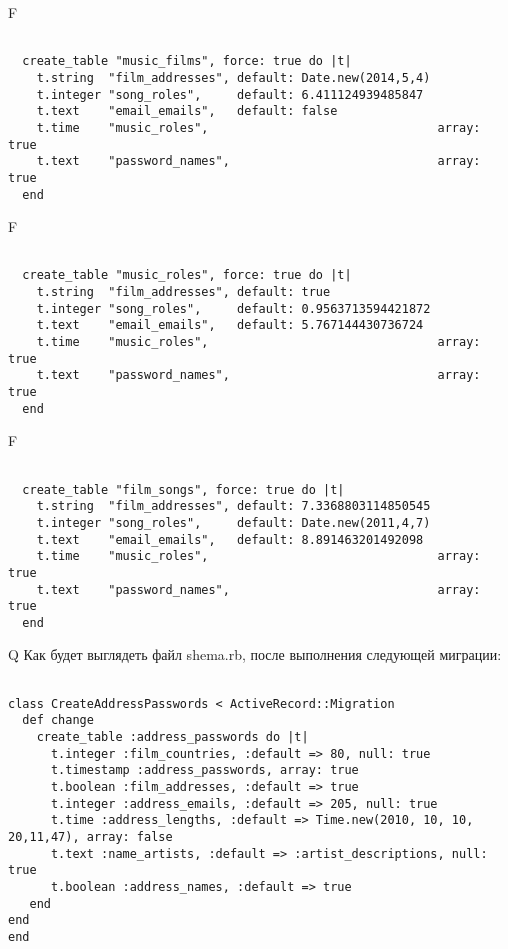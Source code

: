 F
\begin{verbatim}

  create_table "music_films", force: true do |t|
    t.string  "film_addresses", default: Date.new(2014,5,4)
    t.integer "song_roles",     default: 6.411124939485847
    t.text    "email_emails",   default: false
    t.time    "music_roles",                                array: true
    t.text    "password_names",                             array: true
  end

\end{verbatim}

F
\begin{verbatim}

  create_table "music_roles", force: true do |t|
    t.string  "film_addresses", default: true
    t.integer "song_roles",     default: 0.9563713594421872
    t.text    "email_emails",   default: 5.767144430736724
    t.time    "music_roles",                                array: true
    t.text    "password_names",                             array: true
  end

\end{verbatim}

F
\begin{verbatim}

  create_table "film_songs", force: true do |t|
    t.string  "film_addresses", default: 7.3368803114850545
    t.integer "song_roles",     default: Date.new(2011,4,7)
    t.text    "email_emails",   default: 8.891463201492098
    t.time    "music_roles",                                array: true
    t.text    "password_names",                             array: true
  end

\end{verbatim}

Q
Как будет выглядеть файл shema.rb, после выполнения следующей миграции:

\begin{verbatim}

class CreateAddressPasswords < ActiveRecord::Migration 
  def change 
    create_table :address_passwords do |t| 
      t.integer :film_countries, :default => 80, null: true
      t.timestamp :address_passwords, array: true
      t.boolean :film_addresses, :default => true
      t.integer :address_emails, :default => 205, null: true
      t.time :address_lengths, :default => Time.new(2010, 10, 10, 20,11,47), array: false
      t.text :name_artists, :default => :artist_descriptions, null: true
      t.boolean :address_names, :default => true
   end
end
end
\end{verbatim}

